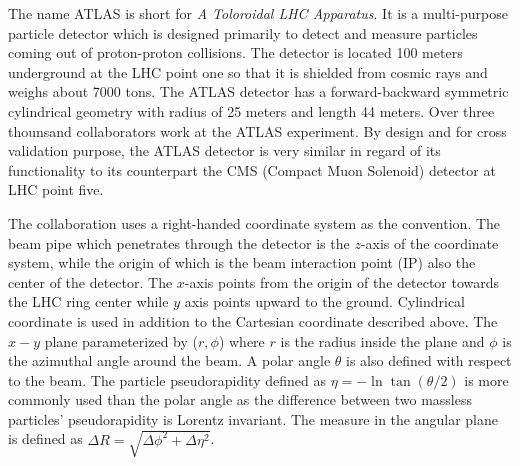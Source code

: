 The name ATLAS is short for \textit{A Toloroidal LHC Apparatus}. It is a multi-purpose particle detector which is designed primarily to detect and measure particles coming out of proton-proton collisions. The detector is located 100 meters underground at the LHC point one so that it is shielded from cosmic rays and weighs about 7000 tons. The ATLAS detector has a forward-backward symmetric cylindrical geometry with radius of 25 meters and length 44 meters. Over three thounsand collaborators work at the ATLAS experiment. By design and for cross validation purpose, the ATLAS detector is very similar in regard of its functionality to its counterpart the CMS (Compact Muon Solenoid) detector at LHC point five. 

The collaboration uses a right-handed coordinate system as the convention. The beam pipe which penetrates through the detector is the $z$-axis of the coordinate system, while the origin of which is the beam interaction point (IP) also the center of the detector. The $x$-axis points from the origin of the detector towards the LHC ring center while $y$ axis points upward to the ground. Cylindrical coordinate is used in addition to the Cartesian coordinate described above. The $x-y$ plane parameterized by ($r,\phi$) where $r$ is the radius inside the plane and $\phi$ is the azimuthal angle around the beam. A polar angle $\theta$ is also defined with respect to the beam. The particle pseudorapidity defined as $\eta = -\ln \tan(\theta/2)$ is more commonly used than the polar angle as the difference between two massless particles' pseudorapidity is Lorentz invariant. The measure in the angular plane is defined as $\Delta R = \sqrt{\Delta \phi^2+\Delta \eta^2}$.

